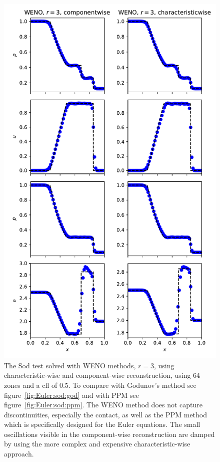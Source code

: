 \begin{figure}[t]
\centering
\includegraphics[width=0.8\linewidth]{weno-euler-r3}
\caption[WENO $r=3$ for the Sod test]
{\label{fig:weno-euler-r3} The Sod test solved with WENO methods, $r=3$, using characteristic-wise and component-wise reconstruction, using 64 zones and a cfl of $0.5$. To compare with Godunov's method see figure~\ref{fig:Euler:sod:god} and with PPM see figure~\ref{fig:Euler:sod:ppm}. The WENO method does not capture discontinuities, especially the contact, as well as the PPM method which is specifically designed for the Euler equations. The small oscillations visible in the component-wise reconstruction are damped by using the more complex and expensive characteristic-wise approach. \\
}
\end{figure}
%


